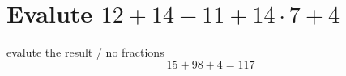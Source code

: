 \documentclass[12pt]{article}
\begin{document}
    
\section{Evalute $12 + 14 -11 + 14 \cdot 7 + 4  $}

evalute the result / no fractions
$$ 15 + 98  + 4 = 117$$
\end{document}
